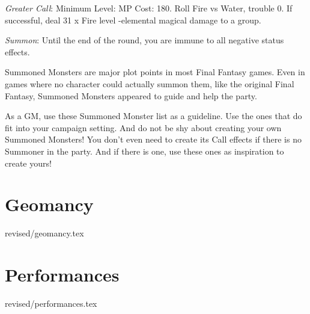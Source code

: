 \begin{multicols}{2}
    \textit{Greater Call}: Minimum Level:  MP Cost: 180. Roll Fire vs Water, trouble 0. If successful, deal 31 x Fire level -elemental magical damage to a group.
    
    \textit{Summon}: Until the end of the round, you are immune to all negative status effects.

\begin{mog}
    Summoned Monsters are major plot points in most Final Fantasy games. Even in games where no character could actually summon them, like the original Final Fantasy, Summoned Monsters appeared to guide and help the party. \pc%

    As a GM, use these Summoned Monster list as a guideline. Use the ones that do fit into your campaign setting. And do not be shy about creating your own Summoned Monsters! You don't even need to create its Call effects if there is no Summoner in the party. And if there is one, use these ones as inspiration to create yours!
\end{mog}
\end{multicols}
\clearpage
\section{Geomancy}\label{sec:magic-geomancy}
 {revised/geomancy.tex}

\section{Performances}\label{sec:magic-performances}
 {revised/performances.tex}
